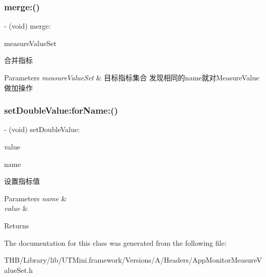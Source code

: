 \subsubsection{\texorpdfstring{merge\+:()}{merge:()}}
{\footnotesize\ttfamily -\/ (void) merge\+: \begin{DoxyParamCaption}\item[{(\mbox{\hyperlink{interface_app_monitor_measure_value_set}{App\+Monitor\+Measure\+Value\+Set}} $\ast$)}]{measure\+Value\+Set }\end{DoxyParamCaption}}

合并指标


\begin{DoxyParams}{Parameters}
{\em measure\+Value\+Set} & 目标指标集合 发现相同的name就对\+Measure\+Value做加操作 \\
\hline
\end{DoxyParams}
\mbox{\label{interface_app_monitor_measure_value_set_a5bcef99549e7aa6dc261fac6402d198b}} 
\subsubsection{\texorpdfstring{set\+Double\+Value\+:for\+Name\+:()}{setDoubleValue:forName:()}}
{\footnotesize\ttfamily -\/ (void) set\+Double\+Value\+: \begin{DoxyParamCaption}\item[{(double)}]{value }\item[{forName:(N\+S\+String $\ast$)}]{name }\end{DoxyParamCaption}}

设置指标值


\begin{DoxyParams}{Parameters}
{\em name} & \\
\hline
{\em value} & \\
\hline
\end{DoxyParams}
\begin{DoxyReturn}{Returns}

\end{DoxyReturn}


The documentation for this class was generated from the following file\+:\begin{DoxyCompactItemize}
\item 
T\+H\+B/\+Library/lib/\+U\+T\+Mini.\+framework/\+Versions/\+A/\+Headers/App\+Monitor\+Measure\+Value\+Set.\+h\end{DoxyCompactItemize}
